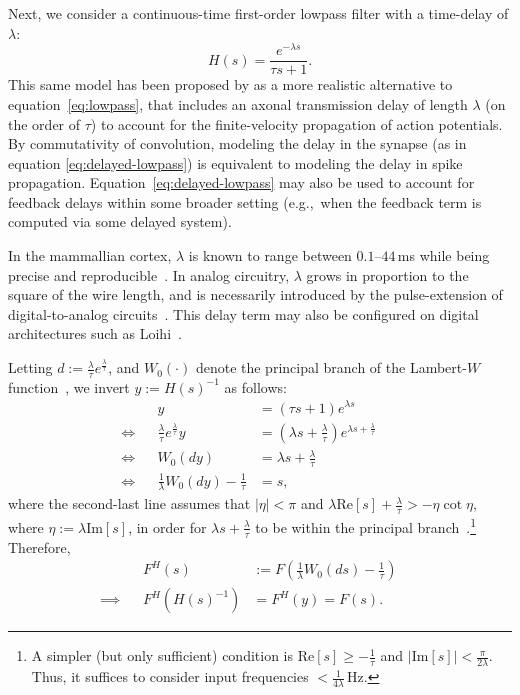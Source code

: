 Next, we consider a continuous-time first-order lowpass filter with a time-delay of $\lambda$:
\begin{equation} \label{eq:delayed-lowpass}
H(s) = \frac{e^{-\lambda s}}{\tau s + 1} \text{.}
\end{equation}
This same model has been proposed by \citet[][equation~6.2]{roth2009modeling} as a more realistic alternative to equation~\ref{eq:lowpass}, that includes an axonal transmission delay of length $\lambda$ (on the order of $\tau$) to account for the finite-velocity propagation of action potentials.
By commutativity of convolution, modeling the delay in the synapse (as in equation \ref{eq:delayed-lowpass}) is equivalent to modeling the delay in spike propagation.
Equation~\ref{eq:delayed-lowpass} may also be used to account for feedback delays within some broader setting (e.g.,~when the feedback term is computed via some delayed system).

In the mammallian cortex, $\lambda$ is known to range between $0.1$--$44$\,ms while being precise and reproducible~\citep{lagorce2015stick}.
In analog circuitry, $\lambda$ grows in proportion to the square of the wire length, and is necessarily introduced by the pulse-extension of digital-to-analog circuits~\citep{voelker2017iscas}.
This delay term may also be configured on digital architectures such as Loihi~\citep{davies2018loihi}.

Letting $d := \frac{\lambda}{\tau}e^{\frac{\lambda}{\tau}}$, and $W_0(\cdot)$ denote the principal branch of the Lambert-$W$ function~\citep{corless1996lambertw}, we invert $y := H(s)^{-1}$ as follows:
\begin{align*}
&& y &= \left(\tau s + 1\right) e^{\lambda s} && \\
\iff && \frac{\lambda}{\tau}e^{\frac{\lambda}{\tau}} y &= \left( \lambda s + \frac{\lambda}{\tau} \right) e^{\lambda s + \frac{\lambda}{\tau}} && \\
\iff && W_0(dy) &= \lambda s + \frac{\lambda}{\tau} && \\
\iff && \frac{1}{\lambda} W_0(dy) - \frac{1}{\tau} &= s \text{,} &&
\end{align*}
where the second-last line assumes that $|\eta| < \pi$ and $\lambda \text{Re}\left[ s \right] + \frac{\lambda}{\tau} > - \eta \cot \eta$, where $\eta := \lambda \text{Im}\left[ s \right]$, in order for $\lambda s + \frac{\lambda}{\tau}$ to be within the principal branch~\citep[][equation~4.4]{corless1996lambertw}.\footnote{%
A simpler (but only sufficient) condition is $\text{Re} \left[ s \right] \ge -\frac{1}{\tau}$ and $ | \text{Im} \left[ s \right] | < \frac{\pi}{2 \lambda}$.
Thus, it suffices to consider input frequencies $< \frac{1}{4\lambda}$\,Hz.}
Therefore,
\begin{align}
&& F^H(s) &:= F\left( \frac{1}{\lambda} W_0(ds) - \frac{1}{\tau} \right) \label{eq:delayed-lowpass-mapped} && \\
\implies && F^H(H(s)^{-1}) &= F^H(y) = F(s) \text{.} && \nonumber
\end{align}


